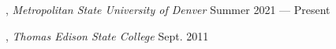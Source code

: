 
,
\textit{Metropolitan State University of Denver} \hfill	Summer 2021 ---
Present

, \textit{Thomas Edison
	State College} \hfill	Sept. 2011

